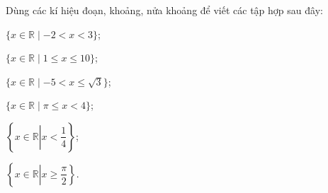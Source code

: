 \begin{vd}%
	Dùng các kí hiệu đoạn, khoảng, nửa khoảng để viết các tập hợp sau đây:
	\begin{listEX}[1]
		\item $\{x \in \mathbb{R} \mid-2< x < 3\}$\dotfill;
		\item $\{x \in \mathbb{R} \mid 1\leq x \leq 10\}$\dotfill;
		\item $\{x \in \mathbb{R} \mid-5< x \leq \sqrt{3}\}$\dotfill;
		\item $\{x \in \mathbb{R} \mid \pi \leq x < 4\}$\dotfill;
		\item $\left\{x \in \mathbb{R} \left\lvert x < \dfrac{1}{4}\right.\right\}$\dotfill;
		\item $\left\{x \in \mathbb{R} \left\lvert x \geq \dfrac{\pi}{2}\right.\right\}$\dotfill.
	\end{listEX}
\loigiai{
	\begin{listEX}[2]
		\item $\{x \in \mathbb{R} \mid-2< x < 3\}=(-2;3)$;
		\item $\{x \in \mathbb{R} \mid 1\leq x \leq 10\}=[1;10]$;
		\item $\{x \in \mathbb{R} \mid-5< x \leq \sqrt{3}\}=\left(-5;\sqrt{3}\,\right]$;
		\item $\{x \in \mathbb{R} \mid \pi \leq x < 4\}=[\pi;4)$;
		\item $\left\{x \in \mathbb{R} \left\lvert x < \dfrac{1}{4}\right.\right\}=\left(-\infty;\dfrac{1}{4}\right)$;
		\item $\left\{x \in \mathbb{R} \left\lvert x \geq \dfrac{\pi}{2}\right.\right\}=\left[\dfrac{\pi}{2};+\infty\right) $.
	\end{listEX}}
\end{vd}
